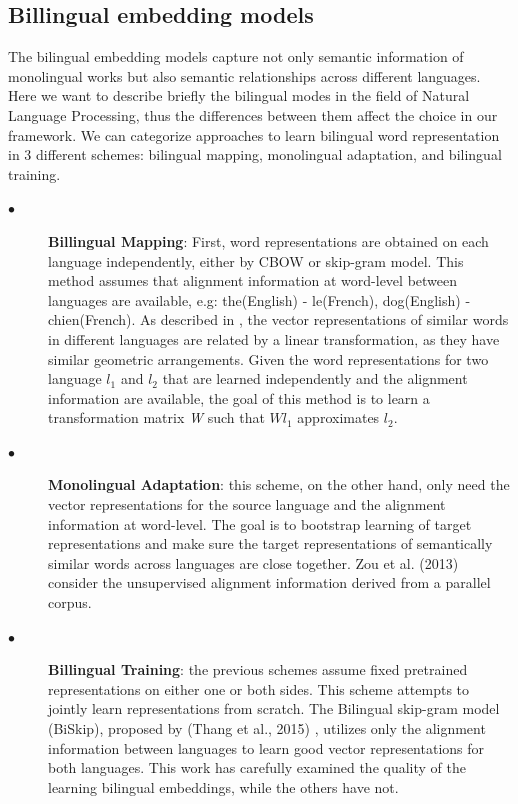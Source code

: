 \subsection{Billingual embedding models}
The bilingual embedding models capture not only semantic information of monolingual works but also semantic relationships across different languages. Here we want to describe briefly the bilingual modes in the field of Natural Language Processing, thus the differences between them affect the choice in our framework. We can categorize approaches to learn bilingual word representation in 3 different schemes: bilingual mapping, monolingual adaptation, and bilingual training.
\begin{description}
	\item [$\bullet$] \textbf{Billingual Mapping}: First, word representations are obtained on each language independently, either by CBOW or skip-gram model. This method assumes that alignment information at word-level between languages are available, e.g: the(English) - le(French), dog(English) - chien(French). As described in \cite{mikolov2013exploiting}, the vector representations of similar words in different languages are related by a linear transformation, as they have similar geometric arrangements. Given the word representations for two language \begin{math}l_{1}\end{math} and \begin{math}l_{2}\end{math} that are learned independently and the alignment information are available, the goal of this method is to learn a transformation matrix \textit{W} such that \begin{math}W l_{1}\end{math} approximates \begin{math}l_{2}\end{math}.
	\item [$\bullet$] \textbf{Monolingual Adaptation}: this scheme, on the other hand, only need the vector representations for the source language and the alignment information at word-level. The goal is to bootstrap learning of target representations and make sure the target representations of semantically similar words across languages are close together. Zou et al. (2013) consider the unsupervised alignment information derived from a parallel corpus.
	\item [$\bullet$] \textbf{Billingual Training}: the previous schemes assume fixed pretrained representations on either one or both sides. This scheme attempts to jointly learn representations from scratch. The Bilingual skip-gram model (BiSkip), proposed by (Thang et al., 2015) \cite{luong2015bilingual}, utilizes only the alignment information between languages to learn good vector representations for both languages. This work has carefully examined the quality of the learning bilingual embeddings, while the others have not.
\end{description}
